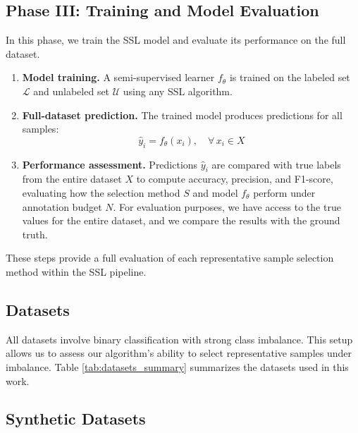 \documentclass[preprint,12pt]{elsarticle}
\begin{document}
\subsection*{Phase III: Training and Model Evaluation}\label{subsec:Phase3}

In this phase, we train the SSL model and evaluate its performance on the full dataset.

\begin{enumerate}
  \item \textbf{Model training.} A semi-supervised learner $f_{\theta}$ is trained on the labeled set $\mathcal{L}$ and unlabeled set $\mathcal{U}$ using any SSL algorithm.
  
  \item \textbf{Full-dataset prediction.} The trained model produces predictions for all samples:
  \begin{equation}
    \hat{y}_i = f_{\theta}(x_i), \quad \forall\,x_i \in X
  \end{equation}

  \item \textbf{Performance assessment.} Predictions $\hat{y}_i$ are compared with true labels from the entire dataset $X$ to compute accuracy, precision, and F1-score, evaluating how the selection method $S$ and model $f_{\theta}$ perform under annotation budget $N$. For evaluation purposes, we have access to the true values for the entire dataset, and we compare the results with the ground truth.
\end{enumerate}

These steps provide a full evaluation of each representative sample selection method within the SSL pipeline.

\subsection{Datasets}

All datasets involve binary classification with strong class imbalance. This setup allows us to assess our algorithm’s ability to select representative samples under imbalance. Table \ref{tab:datasets_summary} summarizes the datasets used in this work.

\subsection*{Synthetic Datasets}
\end{document}
